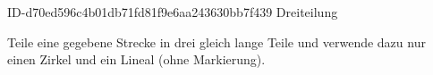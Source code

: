 \begin{exercise}
      {ID-d70ed596c4b01db71fd81f9e6aa243630bb7f439}
      {Dreiteilung}
  \ifproblem\problem\par
    Teile eine gegebene Strecke in drei gleich lange Teile und
    verwende dazu nur einen Zirkel und ein Lineal (ohne Markierung).
  \fi
\end{exercise}
